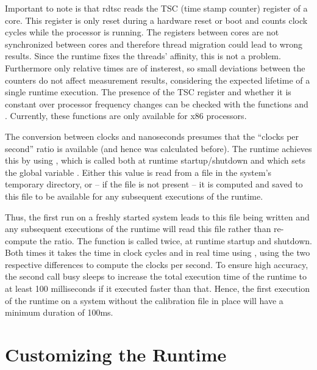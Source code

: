 Important to note is that rdtsc reads the TSC (time stamp counter) register of a
core. This register is only reset during a hardware reset or boot and counts
clock cycles while the processor is running. The registers between cores are not
synchronized between cores and therefore thread migration could lead to wrong
results. Since the runtime fixes the threads' affinity, this is not a problem.
Furthermore only relative times are of insterest, so small deviations between
the counters do not affect measurement results, considering the expected
lifetime of a single runtime execution. The presence of the TSC register and
whether it is constant over processor frequency changes can be checked with the
functions  and
. Currently, these functions are only
available for x86 processors.

The conversion between clocks and nanoseconds presumes that the ``clocks per
second'' ratio is available (and hence was calculated before). The runtime
achieves this by using ,
which is called both at runtime startup/shutdown and which sets the global
variable . Either this value is read from a
file  in the system's temporary directory,
or -- if the file is not present -- it is computed and saved to this file to be
available for any subsequent executions of the runtime. 

Thus, the first run on a freshly started system leads to this file being written
and any subsequent executions of the runtime will read this file rather than
re-compute the ratio. The function
 is called twice, at
runtime startup and shutdown. Both times it takes the time in clock cycles and
in real time using , using the two respective
differences to compute the clocks per second. To ensure high accuracy, the
second call busy sleeps to increase the total execution time of the runtime to
at least 100 milliseconds if it executed faster than that. Hence, the first
execution of the runtime on a system without the calibration file in place will
have a minimum duration of 100ms.


\section{Customizing the Runtime}
